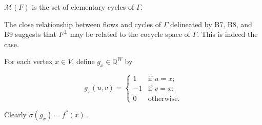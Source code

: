 $\mathcal{M}(F)$ is the set of elementary cycles of $\Gamma$.

The close relationship between flows and cycles of $\Gamma$ delineated by B7, B8, and B9 suggests that $F^\perp$ may be related to the cocycle space of $\Gamma$. This is indeed the case.

For each vertex $x \in V$, define $g_x \in \mathbb{Q}^W$ by

$$g_x(u, v) = \begin{cases} 
1 & \text{if } u = x; \\
-1 & \text{if } v = x; \\
0 & \text{otherwise.}
\end{cases}$$

Clearly $\sigma(g_x) = f^*(x)$.
